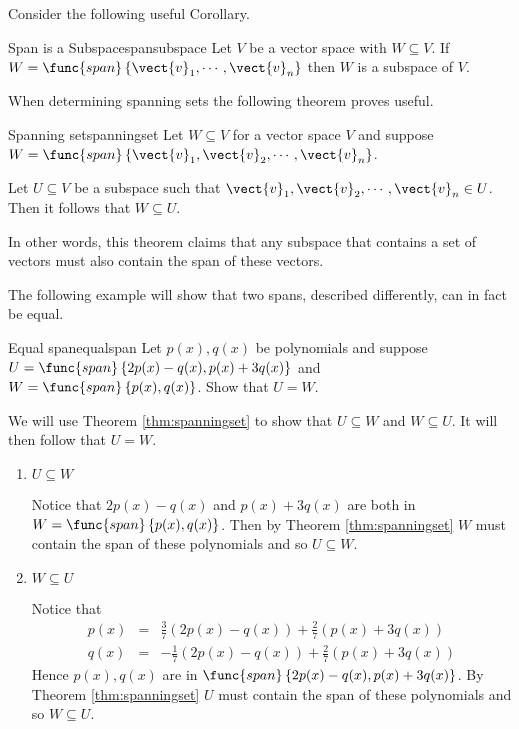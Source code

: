 Consider the following useful Corollary.

\begin{corollary}{Span is a Subspace}{spansubspace}
Let $V$ be a vector space with $W \subseteq V$. If $W = \func{span} \left\{ \vect{v}_1, \cdots,  \vect{v}_n \right\}$ then $W$ is a subspace of $V$.
\end{corollary}

When determining spanning sets the following theorem proves useful.

\begin{theorem}{Spanning set}{spanningset}
Let $W \subseteq V$ for a vector space $V$ and suppose $W = \func{span} \left\{ \vect{v}_1, \vect{v}_2, \cdots, \vect{v}_n \right\}$. 

Let $U \subseteq V$ be a subspace such that $\vect{v}_1, \vect{v}_2, \cdots, \vect{v}_n \in U$. Then it follows that $W \subseteq U$. 
\end{theorem}

In other words, this theorem claims that any subspace that contains a set of vectors must also contain the span of these vectors. 

The following example will show that two spans, described differently, can in fact be equal. 

\begin{example}{Equal span}{equalspan}
Let $p(x), q(x)$ be polynomials and suppose $U = \func{span}\left\{ 2p(x) - q(x), p(x) + 3q(x)\right\} $ and $W =  \func{span}\left\{ p(x), q(x) \right\}$. Show that $U = W$. 
\end{example}

\begin{solution}
We will use Theorem \ref{thm:spanningset} to show that $U \subseteq W$ and $W \subseteq U$. It will then follow that $U=W$. 
\begin{enumerate}
\item $U \subseteq W$

Notice that $2p(x) - q(x)$ and $p(x) + 3q(x)$  are both in $W = \func{span} \left\{ p(x), q(x) \right\}$. Then by Theorem \ref{thm:spanningset} $W$ must contain the span of these polynomials and so $U \subseteq W$. 

\item $W \subseteq U$

Notice that 
\begin{eqnarray*}
p(x) &=& \frac{3}{7} \left( 2p(x) - q(x) \right)  + \frac{2}{7} \left( p(x) + 3q(x)\right) \\
q(x) &=& -\frac{1}{7} \left( 2p(x) - q(x) \right)  + \frac{2}{7} \left( p(x) + 3q(x)\right)
\end{eqnarray*}
Hence $p(x), q(x)$ are in $\func{span} \left\{ 2p(x) - q(x), p(x) + 3q(x) \right\}$. By Theorem \ref{thm:spanningset} $U$ must contain the span of these polynomials and so $W \subseteq U$. 
\end{enumerate}
\end{solution}

